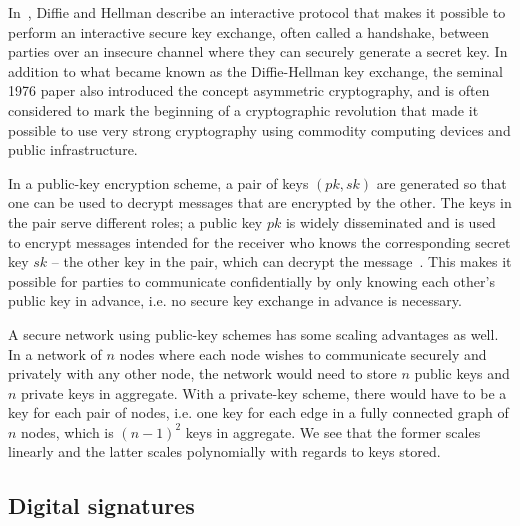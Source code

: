 In~\cite{diffie1976new}, Diffie and Hellman describe an interactive protocol that makes it possible to perform an interactive secure key exchange, often called a handshake, between parties over an insecure channel where they can securely generate a secret key. In addition to what became known as the Diffie-Hellman key exchange, the seminal 1976 paper also introduced the concept asymmetric cryptography, and is often considered to mark the beginning of a cryptographic revolution that made it possible to use very strong cryptography using commodity computing devices and public infrastructure. 

In a public-key encryption scheme, a pair of keys $(pk, sk)$ are generated so that one can be used to decrypt messages that are encrypted by the other. The keys in the pair serve different roles; a public key $pk$ is widely disseminated and is used to encrypt messages intended for the receiver who knows the corresponding secret key $sk$ – the other key in the pair, which can decrypt the message~\cite[p.~370]{lindell2014introduction}. This makes it possible for parties to communicate confidentially by only knowing each other's public key in advance, i.e. no secure key exchange in advance is necessary. 

A secure network using public-key schemes has some scaling advantages as well. In a network of $n$ nodes where each node wishes to communicate securely and privately with any other node, the network would need to store $n$ public keys and $n$ private keys in aggregate. With a private-key scheme, there would have to be a key for each pair of nodes, i.e. one key for each edge in a fully connected graph of $n$ nodes, which is $(n-1)^2$ keys in aggregate. We see that the former scales linearly and the latter scales polynomially with regards to keys stored. 

\subsection{Digital signatures}

